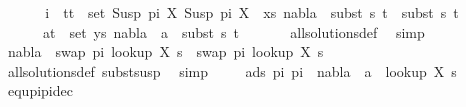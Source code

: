 \begin{isabellebody}
\ {}\isanewline
\ \ \ \isamarkupfalse%
\ i{\isacharcolon}{\kern0pt}\ {\isachardoublequoteopen}{\isasymforall}\ {\isacharparenleft}{\kern0pt}t{}{\isacharcomma}{\kern0pt}t{}{\isacharparenright}{\kern0pt}\ {\isasymin}\ set\ {\isacharparenleft}{\kern0pt}{\isacharparenleft}{\kern0pt}Susp\ pi{}\ X{\isacharcomma}{\kern0pt}\ Susp\ pi{}\ X{\isacharparenright}{\kern0pt}\ {\isacharhash}{\kern0pt}\ xs{\isacharparenright}{\kern0pt}{\isachardot}{\kern0pt}\ nabla{}\ {\isasymturnstile}\ subst\ s{}\ t{}\ {\isasymapprox}\ subst\ s{}\ t{}{\isachardoublequoteclose}\isanewline
\ \ \ \ \ {\isachardoublequoteopen}{\isasymforall}\ {\isacharparenleft}{\kern0pt}a{\isacharcomma}{\kern0pt}t{\isacharparenright}{\kern0pt}\ {\isasymin}\ set\ ys{\isachardot}{\kern0pt}\ nabla{}\ {\isasymturnstile}\ a\ {\isasymsharp}\ subst\ s{}\ t{\isachardoublequoteclose}\isanewline
\ \ \ \ \ \isamarkupfalse%
\ all{\isacharunderscore}{\kern0pt}solutions{\isacharunderscore}{\kern0pt}def\ \isamarkupfalse%
\ simp{\isacharplus}{\kern0pt}\isanewline
\isanewline
\isanewline
\ \ \ \isamarkupfalse%
\ {}{\isacharparenleft}{\kern0pt}{}{\isacharparenright}{\kern0pt}\isanewline
\ \ \ \isamarkupfalse%
\ {\isachardoublequoteopen}nabla{}\ {\isasymturnstile}\ swap\ pi{}\ {\isacharparenleft}{\kern0pt}look{\isacharunderscore}{\kern0pt}up\ X\ s{}{\isacharparenright}{\kern0pt}\ {\isasymapprox}\ swap\ pi{}\ {\isacharparenleft}{\kern0pt}look{\isacharunderscore}{\kern0pt}up\ X\ s{}{\isacharparenright}{\kern0pt}{\isachardoublequoteclose}\isanewline
\ \ \ \ \ \isamarkupfalse%
\ all{\isacharunderscore}{\kern0pt}solutions{\isacharunderscore}{\kern0pt}def\ subst{\isacharunderscore}{\kern0pt}susp\ \isamarkupfalse%
\ simp\isanewline
\ \ \ \isamarkupfalse%
\ {\isachardoublequoteopen}{\isasymforall}a{\isasymin}ds\ pi{}\ pi{}{\isachardot}{\kern0pt}\ \ nabla{}\ {\isasymturnstile}\ a\ {\isasymsharp}\ {\isacharparenleft}{\kern0pt}look{\isacharunderscore}{\kern0pt}up\ X\ s{}{\isacharparenright}{\kern0pt}{\isachardoublequoteclose}\isanewline
\ \ \ \ \ \isamarkupfalse%
\ equ{\isacharunderscore}{\kern0pt}pi{}{\isacharunderscore}{\kern0pt}pi{}{\isacharunderscore}{\kern0pt}dec\ \isamarkupfalse%

\end{isabellebody}
